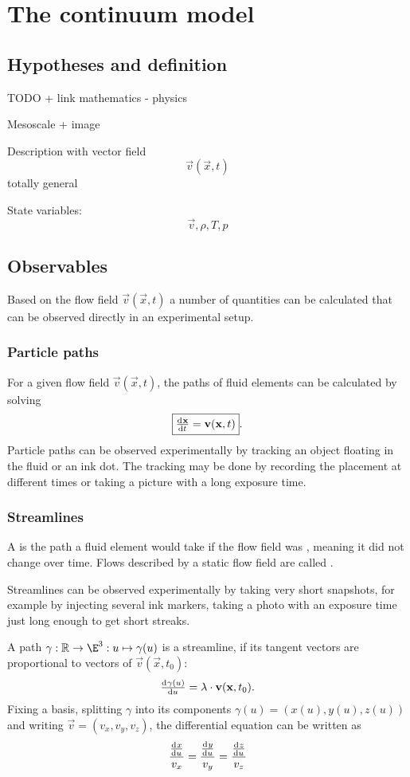 \chapter{The continuum model}
\section{Hypotheses and definition}
TODO + link mathematics - physics

Mesoscale + image

Description with vector field
\[ \vec{v}(\vec{x},t) \]
totally general

State variables:
\[ \vec{v}, \rho, T, p \]


\section{Observables}
Based on the flow field $\vec{v}(\vec{x},t)$ a number of quantities can be calculated that can be observed directly in an experimental setup.
\subsection{Particle paths}
For a given flow field $\vec{v}(\vec{x},t)$, the paths of fluid elements can be calculated by solving
\[ \boxed{\od{\vec{x}}{t} = \vec{v}(\vec{x},t)}. \]
Particle paths can be observed experimentally by tracking an object floating in the fluid or an ink dot. The tracking may be done by recording the placement at different times or taking a picture with a long exposure time.
\subsection{Streamlines}
A  is the path a fluid element would take if the flow field was , meaning it did not change over time. Flows described by a static flow field are called .

Streamlines can be observed experimentally by taking very short snapshots, for example by injecting several ink markers, taking a photo with an exposure time just long enough to get short streaks.

A path $\gamma: \R \to \E^3: u \mapsto \gamma(u)$ is a streamline, if its tangent vectors are proportional to vectors of $\vec{v}(\vec{x},t_0)$:
\[ \od{\gamma(u)}{u} = \lambda \cdot \vec{v}(\vec{x},t_0). \]
Fixing a basis, splitting $\gamma$ into its components $\gamma(u) = \left(x(u), y(u), z(u)\right)$ and writing $\vec{v} = (v_x, v_y, v_z)$, the differential equation can be written as
\[ \frac{\od{x}{u}}{v_x} = \frac{\od{y}{u}}{v_y} = \frac{\od{z}{u}}{v_z} \]

